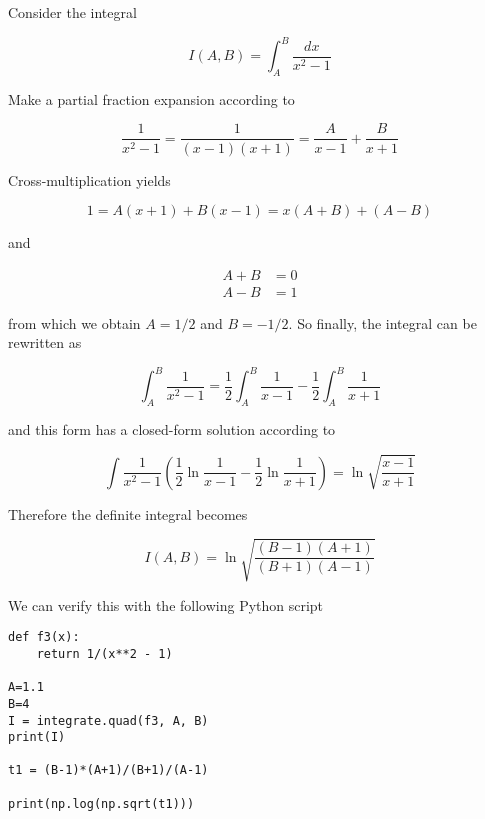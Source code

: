 
Consider the integral

\[
I(A,B) = \int_A^B \frac{dx}{x^2-1}
\]

Make a partial fraction expansion according to

\[
\frac{1}{x^2-1} = \frac{1}{(x-1)(x+1)} = \frac{A}{x-1} + \frac{B}{x+1}
\]

Cross-multiplication yields

\[
1 = A(x+1) + B(x-1) = x(A+B) + (A-B)
\]

and


\begin{align}
A+B & = 0 \\
A-B & = 1
\end{align}


from which we obtain \(A = 1/2\) and \(B = -1/2\). So finally, the
integral can be rewritten as

\[
\int_A^B \frac{1}{x^2-1} = \frac{1}{2} \int_A^B \frac{1}{x-1} - \frac{1}{2} \int_A^B \frac{1}{x+1}
\]

and this form has a closed-form solution according to

\[
\int \frac{1}{x^2-1} \left( \frac{1}{2} \ln \frac{1}{x-1} - \frac{1}{2} \ln \frac{1}{x+1} \right) = \ln \sqrt{\frac{x-1}{x+1}}
\]

Therefore the definite integral becomes

\[
I(A,B) = \ln \sqrt{\frac{(B-1)(A+1)}{(B+1)(A-1)}}
\]

We can verify this with the following Python script

\begin{verbatim}
def f3(x):
    return 1/(x**2 - 1)

A=1.1
B=4
I = integrate.quad(f3, A, B)
print(I)

t1 = (B-1)*(A+1)/(B+1)/(A-1)

print(np.log(np.sqrt(t1)))
\end{verbatim}
